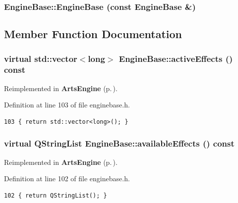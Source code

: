 \subsubsection{\setlength{\rightskip}{0pt plus 5cm}Engine\-Base::Engine\-Base (const {\bf Engine\-Base} \&)\hspace{0.3cm}{\tt  [protected]}}\label{classEngineBase_EngineBaseb3}




\subsection{Member Function Documentation}
\subsubsection{\setlength{\rightskip}{0pt plus 5cm}virtual std::vector$<$long$>$ Engine\-Base::active\-Effects () const\hspace{0.3cm}{\tt  [inline, virtual]}}\label{classEngineBase_EngineBasea17}




Reimplemented in {\bf Arts\-Engine} {\rm (p.\,\pageref{classArtsEngine_ArtsEnginea11})}.

Definition at line 103 of file enginebase.h.



\footnotesize\begin{verbatim}103 { return std::vector<long>(); }
\end{verbatim}\normalsize 
{}
\subsubsection{\setlength{\rightskip}{0pt plus 5cm}virtual QString\-List Engine\-Base::available\-Effects () const\hspace{0.3cm}{\tt  [inline, virtual]}}\label{classEngineBase_EngineBasea16}




Reimplemented in {\bf Arts\-Engine} {\rm (p.\,\pageref{classArtsEngine_ArtsEnginea10})}.

Definition at line 102 of file enginebase.h.



\footnotesize\begin{verbatim}102 { return QStringList(); }
\end{verbatim}\normalsize 
{}
